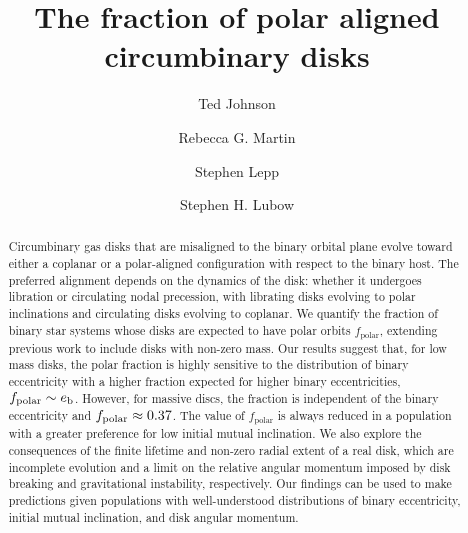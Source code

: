 \documentclass[twocolumn,linenumbers]{aastex631}
\begin{document}
\title{The fraction of polar aligned circumbinary disks}

\author[0000-0002-1570-2203]{Ted Johnson}
\author[0000-0003-2401-7168]{Rebecca G. Martin}
\author[0000-0003-2270-1310]{Stephen Lepp}
\author[0000-0002-4636-7348]{Stephen H. Lubow}

\begin{abstract}

    Circumbinary gas disks that are misaligned to the binary orbital plane evolve toward either a coplanar or a polar-aligned configuration with respect to the binary host. The preferred alignment depends on the dynamics of the disk: whether it undergoes libration or circulating nodal precession, with librating disks evolving to polar inclinations and circulating disks evolving to coplanar.
    We quantify the fraction of binary star systems whose disks are expected to have polar orbits $f_\text{polar}$, extending previous work to include disks with non-zero mass.
    Our results suggest that, for low mass disks, the polar fraction is highly sensitive to the distribution of binary eccentricity with a higher fraction expected for higher binary eccentricities, $f_{\rm polar}\sim e_{\rm b}$. However, for massive discs, the fraction is independent of the binary eccentricity and $f_{\rm polar}\approx 0.37$. The value of $f_\text{polar}$ is always reduced in a population with a greater preference for low initial mutual inclination.
    We also explore the consequences of the finite lifetime and non-zero radial extent of a real disk, which are incomplete evolution and a limit on the relative angular momentum imposed by disk breaking and gravitational instability, respectively. Our findings can be used to make predictions given populations with well-understood distributions of binary eccentricity, initial mutual inclination, and disk angular momentum.
\end{abstract}
\end{document}
